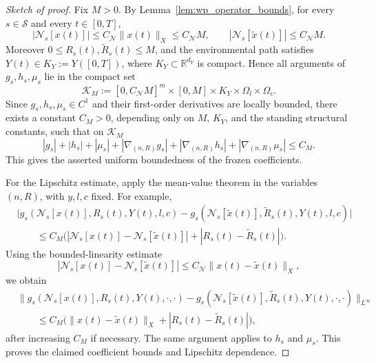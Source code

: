 \documentclass[pdflatex,sn-mathphys-num]{sn-jnl}%
\begin{document}
\begin{proof}[Sketch of proof]
Fix \(M>0\). By Lemma~\ref{lem:wp_operator_bounds}, for every \(s\in\mathcal S\) and
every \(t\in[0,T]\),
\[
|\mathcal N_s[x(t)]|
\le C_{\mathcal N}\|x(t)\|_X
\le C_{\mathcal N}M,
\qquad
|\mathcal N_s[\widetilde x(t)]|
\le C_{\mathcal N}M .
\]
Moreover \(0\le R_s(t),\widetilde R_s(t)\le M\), and the environmental path satisfies
\(Y(t)\in K_Y:=Y([0,T])\), where \(K_Y\subset\mathbb R^{d_Y}\) is compact. Hence all
arguments of \(g_s,h_s,\mu_s\) lie in the compact set
\[
\mathcal K_M
:=
[0,C_{\mathcal N}M]^m
\times[0,M]
\times K_Y
\times\Omega_l
\times\Omega_c .
\]
Since \(g_s,h_s,\mu_s\in C^1\) and their first-order derivatives are locally bounded,
there exists a constant \(C_M>0\), depending only on \(M\), \(K_Y\), and the standing
structural constants, such that on \(\mathcal K_M\)
\[
|g_s|+|h_s|+|\mu_s|
+
|\nabla_{(n,R)}g_s|
+
|\nabla_{(n,R)}h_s|
+
|\nabla_{(n,R)}\mu_s|
\le C_M .
\]
This gives the asserted uniform boundedness of the frozen coefficients.

For the Lipschitz estimate, apply the mean-value theorem in the variables
\((n,R)\), with \(y,l,c\) fixed. For example,
\[
\begin{aligned}
&\big|
g_s(\mathcal N_s[x(t)],R_s(t),Y(t),l,c)
-
g_s(\mathcal N_s[\widetilde x(t)],\widetilde R_s(t),Y(t),l,c)
\big|
\\
&\qquad
\le
C_M
\Big(
|\mathcal N_s[x(t)]-\mathcal N_s[\widetilde x(t)]|
+
|R_s(t)-\widetilde R_s(t)|
\Big).
\end{aligned}
\]
Using the bounded-linearity estimate
\[
|\mathcal N_s[x(t)]-\mathcal N_s[\widetilde x(t)]|
\le C_{\mathcal N}\|x(t)-\widetilde x(t)\|_X,
\]
we obtain
\[
\begin{aligned}
&\big\|
g_s(\mathcal N_s[x(t)],R_s(t),Y(t),\cdot,\cdot)
-
g_s(\mathcal N_s[\widetilde x(t)],\widetilde R_s(t),Y(t),\cdot,\cdot)
\big\|_{L^\infty}
\\
&\qquad
\le
C_M
\big(
\|x(t)-\widetilde x(t)\|_X
+
|R_s(t)-\widetilde R_s(t)|
\big),
\end{aligned}
\]
after increasing \(C_M\) if necessary. The same argument applies to \(h_s\) and
\(\mu_s\). This proves the claimed coefficient bounds and Lipschitz dependence.
\end{proof}
\end{document}
